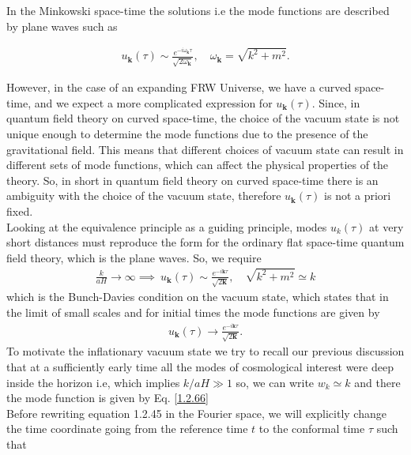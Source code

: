 In the Minkowski space-time the solutions i.e the mode functions are described by plane waves such as

\begin{align}
   u_{\mathbf{k}}(\tau) \sim \frac{e^{-i \omega_{\mathbf{k}} \tau}}{\sqrt{2 \omega_{\mathbf{k}}}}, \quad \omega_{\mathbf{k}}=\sqrt{k^{2}+m^{2}} .
 \end{align}


However, in the case of an expanding FRW Universe, we have a curved space-time, and we expect a more complicated expression for $u_{\mathbf{k}}(\tau)$. Since, in quantum field theory on curved space-time, the choice of the vacuum state is not unique enough to determine the mode functions due to the presence of the gravitational field. This means that different choices of vacuum state can result in different sets of mode functions, which can affect the physical properties of the theory. So, in short in quantum field theory on curved space-time there is an ambiguity with the choice of the vacuum state, therefore $u_{\mathbf{k}}(\tau)$ is not a priori fixed.\\
Looking at the equivalence principle as a guiding principle, modes \(u_{k} (\tau)\) at very short distances must reproduce the form for the ordinary flat space-time quantum field theory, which is the plane waves. So, we require  \begin{align}
    \frac{k}{aH} \rightarrow \infty \implies \  u_{\mathbf{k}}(\tau) \sim \frac{e^{-i \mathbf{k} \tau}}{\sqrt{2\mathbf{k}}}, \quad \sqrt{k^{2}+m^{2}} \simeq k  \label{1.2.65}   
\end{align}which is the Bunch-Davies condition on the vacuum state, which states that in the limit of small scales and for initial times the mode functions are given by
\begin{align}
    u_{\mathbf{k}}(\tau) \rightarrow \frac{e^{-i \mathbf{k} \tau}} {\sqrt{2\mathbf{k}}}. \label{1.2.66}
\end{align}
To motivate the inflationary vacuum state we try to recall our previous discussion that at a sufficiently early time all the modes of cosmological interest were deep inside the horizon i.e, which implies $k/aH \gg 1$ so, we can write $w_{k} \simeq k$ and there the mode function is given by Eq. \eqref{1.2.66}\\
\hspace{0.5cm} Before rewriting equation 1.2.45 in the Fourier space, we will explicitly change the time coordinate going from the reference time $t$ to the conformal time $\tau$ such that

